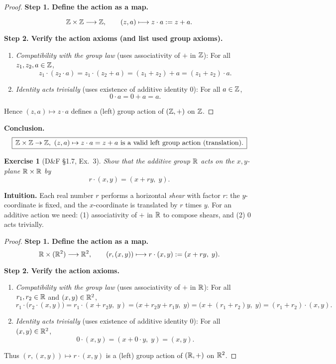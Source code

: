 \documentclass[12pt]{article}
\newtheorem{exercise}[theorem]{Exercise}
\theoremstyle{definition}
\begin{document}
\begin{proof}
\noindent\textbf{Step 1. Define the action as a map.}

\[
\Bbb Z \times \Bbb Z \longrightarrow \Bbb Z,\qquad (z,a)\longmapsto z \cdot a := z+a .
\]

\smallskip
\noindent\textbf{Step 2. Verify the action axioms (and list used group axioms).}
\begin{enumerate}
  \item \emph{Compatibility with the group law} (uses associativity of $+$ in $\Bbb Z$):  
  For all $z_1,z_2,a\in\Bbb Z$,
  \[
  z_1\cdot(z_2\cdot a)=z_1\cdot(z_2+a)=(z_1+z_2)+a=(z_1+z_2)\cdot a.
  \]
  \item \emph{Identity acts trivially} (uses existence of additive identity $0$):  
  For all $a\in\Bbb Z$,
  \[
  0\cdot a=0+a=a.
  \]
\end{enumerate}
Hence $(z,a)\mapsto z\cdot a$ defines a (left) group action of $(\Bbb Z,+)$ on $\Bbb Z$.
\end{proof}

\noindent\textbf{Conclusion.}
\[
\boxed{\,\Bbb Z \times \Bbb Z \to \Bbb Z,\ (z,a)\mapsto z\cdot a=z+a\ \text{is a valid left group action (translation).}\,}
\]

\newpage

\begin{exercise}[D\&F §1.7, Ex.~3]
Show that the additive group $\Bbb R$ acts on the $x,y$-plane $\Bbb R \times \Bbb R$ by
\[
r \cdot (x,y) = (x + r y,\; y).
\]
\end{exercise}

\dotfill

\noindent\textbf{Intuition.}
Each real number $r$ performs a horizontal \emph{shear} with factor $r$: the $y$-coordinate is fixed,
and the $x$-coordinate is translated by $r$ times $y$. For an additive action we need:
(1) associativity of $+$ in $\Bbb R$ to compose shears, and (2) $0$ acts trivially.

\dotfill

\begin{proof}
\noindent\textbf{Step 1. Define the action as a map.}
\[
\Bbb R \times (\Bbb R^2) \longrightarrow \Bbb R^2,\qquad (r,(x,y)) \longmapsto r \cdot (x,y):=(x+ r y,\; y).
\]

\smallskip
\noindent\textbf{Step 2. Verify the action axioms.}
\begin{enumerate}
  \item \emph{Compatibility with the group law} (uses associativity of $+$ in $\Bbb R$):  
  For all $r_1,r_2\in\Bbb R$ and $(x,y)\in\Bbb R^2$,
  \[
  r_1 \cdot \bigl(r_2 \cdot (x,y)\bigr)
  = r_1 \cdot (x + r_2 y,\; y)
  = \bigl(x + r_2 y + r_1 y,\; y\bigr)
  = \bigl(x + (r_1+r_2) y,\; y\bigr)
  = (r_1+r_2)\cdot (x,y).
  \]
  \item \emph{Identity acts trivially} (uses existence of additive identity $0$):  
  For all $(x,y)\in\Bbb R^2$,
  \[
  0 \cdot (x,y) = (x + 0\cdot y,\; y) = (x,y).
  \]
\end{enumerate}
Thus $(r,(x,y))\mapsto r\cdot(x,y)$ is a (left) group action of $(\Bbb R,+)$ on $\Bbb R^2$.
\end{proof}
\end{document}
